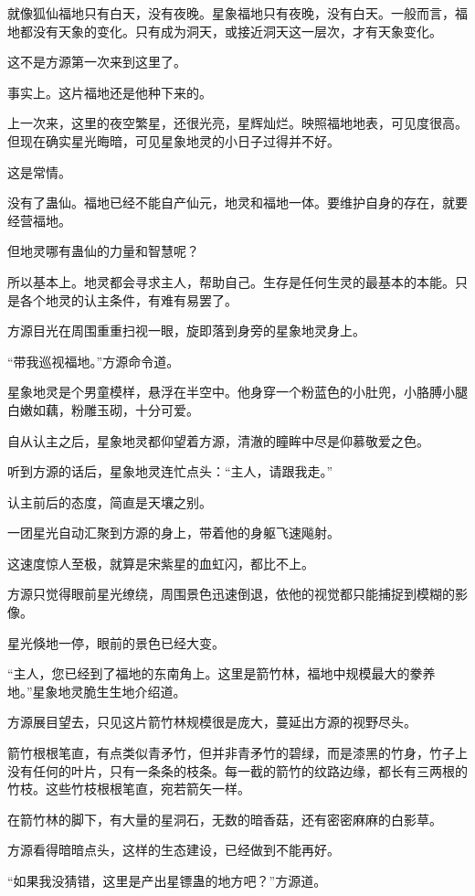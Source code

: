 \begin{this_body}
就像狐仙福地只有白天，没有夜晚。星象福地只有夜晚，没有白天。一般而言，福地都没有天象的变化。只有成为洞天，或接近洞天这一层次，才有天象变化。

这不是方源第一次来到这里了。

事实上。这片福地还是他种下来的。

上一次来，这里的夜空繁星，还很光亮，星辉灿烂。映照福地地表，可见度很高。但现在确实星光晦暗，可见星象地灵的小日子过得并不好。

这是常情。

没有了蛊仙。福地已经不能自产仙元，地灵和福地一体。要维护自身的存在，就要经营福地。

但地灵哪有蛊仙的力量和智慧呢？

所以基本上。地灵都会寻求主人，帮助自己。生存是任何生灵的最基本的本能。只是各个地灵的认主条件，有难有易罢了。

方源目光在周围重重扫视一眼，旋即落到身旁的星象地灵身上。

“带我巡视福地。”方源命令道。

星象地灵是个男童模样，悬浮在半空中。他身穿一个粉蓝色的小肚兜，小胳膊小腿白嫩如藕，粉雕玉砌，十分可爱。

自从认主之后，星象地灵都仰望着方源，清澈的瞳眸中尽是仰慕敬爱之色。

听到方源的话后，星象地灵连忙点头：“主人，请跟我走。”

认主前后的态度，简直是天壤之别。

一团星光自动汇聚到方源的身上，带着他的身躯飞速飚射。

这速度惊人至极，就算是宋紫星的血虹闪，都比不上。

方源只觉得眼前星光缭绕，周围景色迅速倒退，依他的视觉都只能捕捉到模糊的影像。

星光倏地一停，眼前的景色已经大变。

“主人，您已经到了福地的东南角上。这里是箭竹林，福地中规模最大的豢养地。”星象地灵脆生生地介绍道。

方源展目望去，只见这片箭竹林规模很是庞大，蔓延出方源的视野尽头。

箭竹根根笔直，有点类似青矛竹，但并非青矛竹的碧绿，而是漆黑的竹身，竹子上没有任何的叶片，只有一条条的枝条。每一截的箭竹的纹路边缘，都长有三两根的竹枝。这些竹枝根根笔直，宛若箭矢一样。

在箭竹林的脚下，有大量的星洞石，无数的暗香菇，还有密密麻麻的白影草。

方源看得暗暗点头，这样的生态建设，已经做到不能再好。

“如果我没猜错，这里是产出星镖蛊的地方吧？”方源道。


\end{this_body}
